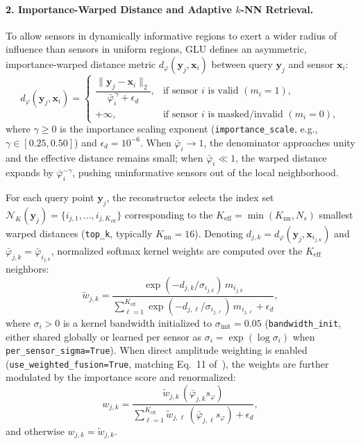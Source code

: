 \paragraph{2. Importance-Warped Distance and Adaptive $k$-NN Retrieval.}
To allow sensors in dynamically informative regions to exert a wider radius of influence than sensors in uniform regions, GLU defines an asymmetric, importance-warped distance metric $d_\varphi(\mathbf{y}_j, \mathbf{x}_i)$ between query $\mathbf{y}_j$ and sensor $\mathbf{x}_i$:
\begin{equation}
    d_\varphi(\mathbf{y}_j, \mathbf{x}_i) = \begin{cases}
        \dfrac{\|\mathbf{y}_j - \mathbf{x}_i\|_2}{\bar{\varphi}_i^{\,\gamma} + \epsilon_d}, & \text{if sensor } i \text{ is valid } (m_i = 1), \\[10pt]
        +\infty, & \text{if sensor } i \text{ is masked/invalid } (m_i = 0),
    \end{cases}
    \label{eq:bg_glu_warped_distance}
\end{equation}
where $\gamma \ge 0$ is the importance scaling exponent (\texttt{importance\_scale}, e.g., $\gamma \in [0.25, 0.50]$) and $\epsilon_d = 10^{-6}$. When $\bar{\varphi}_i \rightarrow 1$, the denominator approaches unity and the effective distance remains small; when $\bar{\varphi}_i \ll 1$, the warped distance expands by $\bar{\varphi}_i^{-\gamma}$, pushing uninformative sensors out of the local neighborhood.

For each query point $\mathbf{y}_j$, the reconstructor selects the index set $\mathcal{N}_K(\mathbf{y}_j) = \{i_{j,1}, \dots, i_{j,K_{\text{eff}}}\}$ corresponding to the $K_{\text{eff}} = \min(K_{\text{nn}}, N_s)$ smallest warped distances (\texttt{top\_k}, typically $K_{\text{nn}} = 16$). Denoting $d_{j,k} = d_\varphi(\mathbf{y}_j, \mathbf{x}_{i_{j,k}})$ and $\bar{\varphi}_{j,k} = \bar{\varphi}_{i_{j,k}}$, normalized softmax kernel weights are computed over the $K_{\text{eff}}$ neighbors:
\begin{equation}
    \tilde{w}_{j,k} = \frac{\exp(-d_{j,k} / \sigma_{i_{j,k}})\, m_{i_{j,k}}}{\sum_{\ell=1}^{K_{\text{eff}}} \exp(-d_{j,\ell} / \sigma_{i_{j,\ell}})\, m_{i_{j,\ell}} + \epsilon_d},
    \label{eq:bg_glu_kernel_weights}
\end{equation}
where $\sigma_i > 0$ is a kernel bandwidth initialized to $\sigma_{\text{init}} = 0.05$ (\texttt{bandwidth\_init}, either shared globally or learned per sensor as $\sigma_i = \exp(\log \sigma_i)$ when \texttt{per\_sensor\_sigma=True}). When direct amplitude weighting is enabled (\texttt{use\_weighted\_fusion=True}, matching Eq.~11 of~\cite{wang2026glu}), the weights are further modulated by the importance score and renormalized:
\begin{equation}
    w_{j,k} = \frac{\tilde{w}_{j,k} \, (\bar{\varphi}_{j,k} s_\varphi)}{\sum_{\ell=1}^{K_{\text{eff}}} \tilde{w}_{j,\ell} \, (\bar{\varphi}_{j,\ell} s_\varphi) + \epsilon_d},
    \label{eq:bg_glu_weighted_fusion}
\end{equation}
and otherwise $w_{j,k} = \tilde{w}_{j,k}$.


